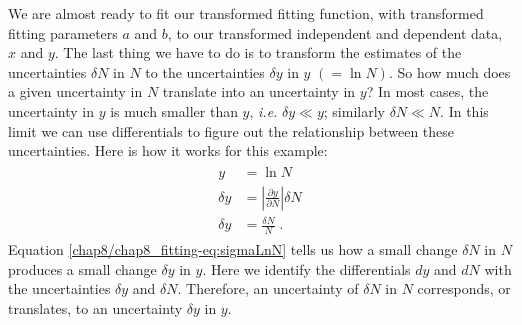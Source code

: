 \documentclass[letterpaper,10pt,english]{sphinxmanual}
\begin{document}
We are almost ready to fit our transformed fitting function, with transformed fitting parameters $a$ and $b$, to our transformed independent and dependent data, $x$ and $y$.  The last thing we have to do is to transform the estimates of the uncertainties $\delta N$ in $N$ to the uncertainties $\delta y$ in $y$ $(= \ln N)$.  So how much does a given uncertainty in $N$ translate into an uncertainty in $y$?  In most cases, the uncertainty in $y$ is much smaller than $y$, \emph{i.e.} $\delta y \ll y$; similarly $\delta N \ll N$.  In this limit we can use differentials to figure out the relationship between these uncertainties.  Here is how it works for this example:
\label{chap8/chap8_fitting:equation-eq:sigmaLnN}\begin{gather}
\begin{split}y &= \ln N\\
\delta y &= \left|\frac{\partial y}{\partial N}\right|\delta N\\
\delta y &= \frac{\delta N} {N} \;.\end{split}\label{chap8/chap8_fitting-eq:sigmaLnN}
\end{gather}
Equation \eqref{chap8/chap8_fitting-eq:sigmaLnN} tells us how a small change $\delta N$ in $N$ produces a small change $\delta y$ in $y$.  Here we identify the differentials $dy$ and $dN$ with the uncertainties $\delta y$ and $\delta N$.  Therefore, an uncertainty of $\delta N$ in $N$ corresponds, or translates, to an uncertainty $\delta y$ in $y$.
\end{document}
